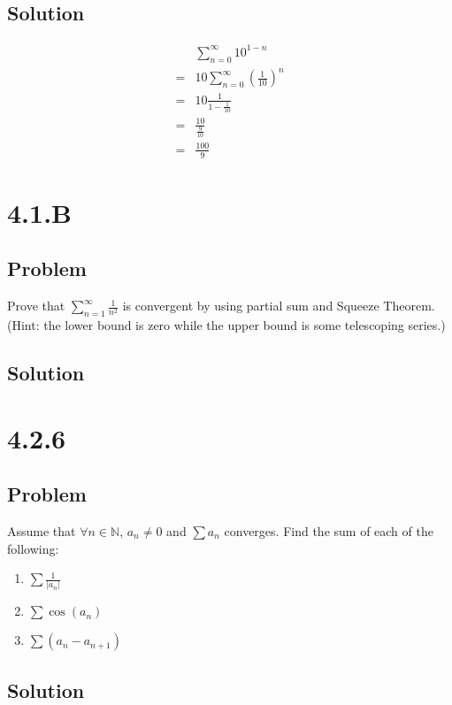 \documentclass[12pt]{article}
\newcommand{\round}[1]{\left(       #1 \right)      }
\newcommand{\abs}  [1]{\left|       #1 \right|      }
\newcommand{\N}    [0]{\mathbb{N}                   }
\begin{document}
\subsection*{Solution}
\begin{align*}
     & \sum_{n=0}^\infty 10^{1-n} \\
    =& 10 \sum_{n=0}^\infty \round{\frac{1}{10}}^n \\
    =& 10 \frac{1}{1 - \frac{1}{10}} \\
    =& \frac{10}{\frac{9}{10}} \\
    =& \frac{100}{9}
\end{align*}



\section*{4.1.B}

\subsection*{Problem}
Prove that $\sum_{n=1}^\infty \frac{1}{n^2}$ is convergent by using partial sum and Squeeze Theorem. (Hint: the lower bound is zero while the upper bound is some telescoping series.)

\subsection*{Solution}



\section*{4.2.6}

\subsection*{Problem}
Assume that $\forall n \in \N$, $a_n \neq 0$ and $\sum a_n$ converges. Find the sum of each of the following:
\begin{enumerate}
    \item $\sum \frac{1}{\abs{a_n}}$
    \item $\sum \cos(a_n)$
    \item $\sum (a_n - a_{n+1})$
\end{enumerate}

\subsection*{Solution}
\end{document}
